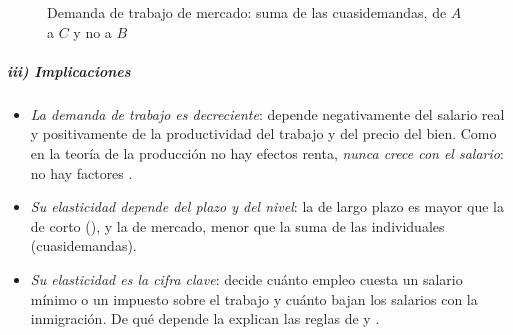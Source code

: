 \documentclass[11pt]{article}
\begin{document}
\begin{figure}[H]
\centering
\caption{Demanda de trabajo de mercado: suma de las cuasidemandas, de $A$ a $C$ y no a $B$}\label{fig:demanda-agregada}
\end{figure}

\subparagraph{iii) Implicaciones}

\begin{itemize}
\item \emph{La demanda de trabajo es decreciente}: depende negativamente del salario real y positivamente de la productividad del trabajo y del precio del bien. Como en la teoría de la producción no hay efectos renta, \emph{nunca crece con el salario}: no hay factores  .
\item \emph{Su elasticidad depende del plazo y del nivel}: la de largo plazo es mayor que la de corto (), y la de mercado, menor que la suma de las individuales (cuasidemandas).
\item \emph{Su elasticidad es la cifra clave}: decide cuánto empleo cuesta un salario mínimo o un impuesto sobre el trabajo y cuánto bajan los salarios con la inmigración. De qué depende la explican las reglas de  y .
\end{itemize}
\end{document}
